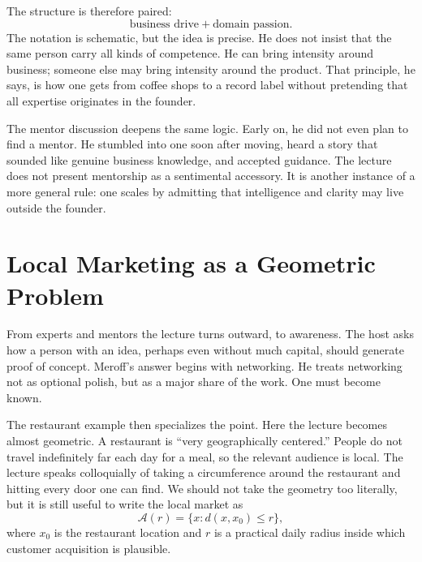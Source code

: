 The structure is therefore paired:
\[
\text{business drive} + \text{domain passion}.
\]
The notation is schematic, but the idea is precise. He does not insist that the same person carry all kinds of competence. He can bring intensity around business; someone else may bring intensity around the product. That principle, he says, is how one gets from coffee shops to a record label without pretending that all expertise originates in the founder.

The mentor discussion deepens the same logic. Early on, he did not even plan to find a mentor. He stumbled into one soon after moving, heard a story that sounded like genuine business knowledge, and accepted guidance. The lecture does not present mentorship as a sentimental accessory. It is another instance of a more general rule: one scales by admitting that intelligence and clarity may live outside the founder.

\section{Local Marketing as a Geometric Problem}

From experts and mentors the lecture turns outward, to awareness. The host asks how a person with an idea, perhaps even without much capital, should generate proof of concept. Meroff's answer begins with networking. He treats networking not as optional polish, but as a major share of the work. One must become known.

The restaurant example then specializes the point. Here the lecture becomes almost geometric. A restaurant is ``very geographically centered.'' People do not travel indefinitely far each day for a meal, so the relevant audience is local. The lecture speaks colloquially of taking a circumference around the restaurant and hitting every door one can find. We should not take the geometry too literally, but it is still useful to write the local market as
\begin{equation}
\mathcal{A}(r)=\{x:d(x,x_0)\le r\},
\end{equation}
where $x_0$ is the restaurant location and $r$ is a practical daily radius inside which customer acquisition is plausible.

